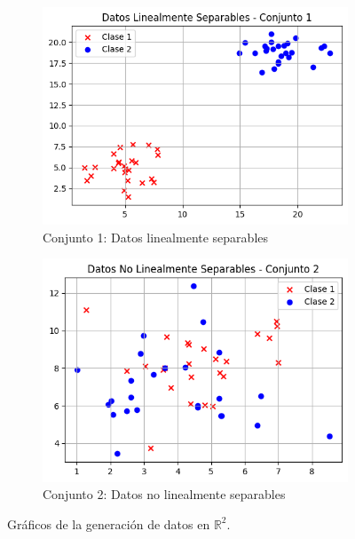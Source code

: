 \documentclass{article}
\begin{document}
\begin{figure}[h!]
    \centering
    \begin{subfigure}{0.49\textwidth}
        \includegraphics[width=\linewidth]{imgs/R2/data/Dataset1_lineal.png}
        \caption{Conjunto 1: Datos linealmente separables}
        \label{fig:lineal}
    \end{subfigure}
    \hfill
    \begin{subfigure}{0.49\textwidth}
       \includegraphics[width=\linewidth]{imgs/R2/data/Dataset2_no_lineal.png}
        \caption{Conjunto 2: Datos no linealmente separables}
        \label{fig:non_lineal}
    \end{subfigure}
    \caption{Gráficos de la generación de datos en $\mathbb{R}^2$.}
    \label{fig:R2_data}
\end{figure}
\end{document}
